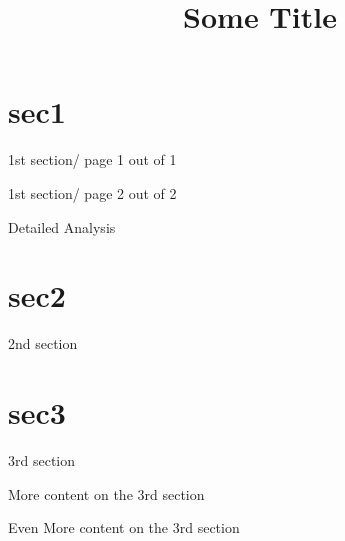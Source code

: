 \documentclass{beamer}
\title{Some Title}
\begin{document}
   \section{sec1}
    \begin{frame}%
    1st section/ page 1 out of 1
    \end{frame}

    \begin{frame}
    1st section/ page 2 out of 2
    \end{frame}

    \begin{frame}[label=Detailed_Analysis]
        Detailed Analysis
    \end{frame}

    \section{sec2}
    \begin{frame}
    2nd section
    \end{frame}

    \section{sec3}
    \begin{frame}
    3rd section
    \end{frame}

    \begin{frame}
    More content on the 3rd section
    \end{frame}

    \begin{frame}
    Even More content on the 3rd section
    \end{frame}
\end{document}
